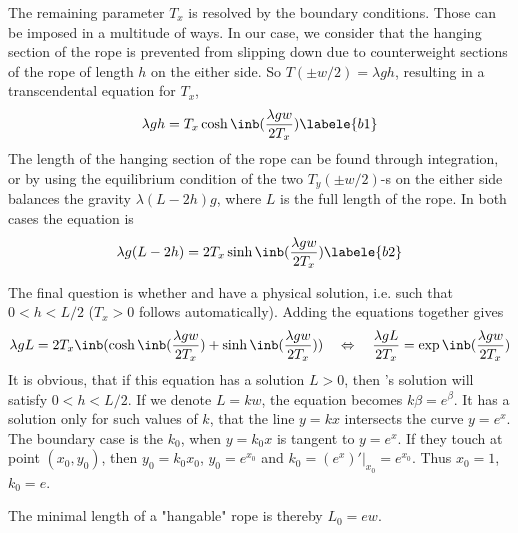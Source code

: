 The remaining parameter $T_x$ is resolved by the boundary conditions.
Those can be imposed in a multitude of ways.
In our case, we consider that the hanging section of the rope
is prevented from slipping down due to counterweight sections of the rope
of length $h$ on the either side.
So $T(\pm w/2) = \lambda g h$, resulting in a transcendental equation for $T_x$, 
\begin{equation}
    \lambda g h = T_x \cosh \inb({\frac{\lambda g w}{2 T_x}})
    \labele{b1}
\end{equation}
The length of the hanging section of the rope can be found through integration,
or by using the equilibrium condition of the two $T_y(\pm w/2)$-s
on the either side balances the gravity $\lambda (L-2h) g$,
where $L$ is the full length of the rope. In both cases the equation is
\begin{equation}
    \lambda g (L - 2h) = 2 T_x \sinh \inb({\frac{\lambda g w}{2 T_x}})
    \labele{b2}
\end{equation}

The final question is whether  and  have a physical solution,
i.e. such that $0<h<L/2$ ($T_x>0$ follows automatically).
Adding the equations together gives
\begin{equation}
    \lambda g L = 2 T_x \inb({\cosh \inb({\frac{\lambda g w}{2 T_x}}) +
                              \sinh \inb({\frac{\lambda g w}{2 T_x}})})
    \quad\Leftrightarrow\quad
    \frac{\lambda g L}{2 T_x} = \exp\inb({\frac{\lambda g w}{2 T_x}})
\end{equation}
It is obvious, that if this equation has a solution $L>0$,
then 's solution will satisfy $0<h<L/2$.
If we denote $L=kw$, the equation becomes $k\beta=e^\beta$.
It has a solution only for such values of $k$,
that the line $y=kx$ intersects the curve $y=e^x$.
The boundary case is the $k_0$, when $y=k_0 x$ is tangent to $y=e^x$.
If they touch at point $(x_0, y_0)$, then $y_0=k_0 x_0$, $y_0=e^{x_0}$ and
$k_0=(e^x)'|_{x_0}=e^{x_0}$. Thus $x_0=1$, $k_0=e$.

The minimal length of a "hangable" rope is thereby $L_0=ew$.
